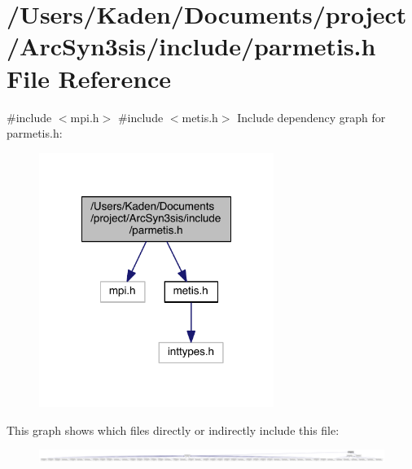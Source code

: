 \hypertarget{a00843}{}\section{/\+Users/\+Kaden/\+Documents/project/\+Arc\+Syn3sis/include/parmetis.h File Reference}
\label{a00843}
{\ttfamily \#include $<$mpi.\+h$>$}\newline
{\ttfamily \#include $<$metis.\+h$>$}\newline
Include dependency graph for parmetis.\+h\+:\nopagebreak
\begin{figure}[H]
\begin{center}
\leavevmode
\includegraphics[width=216pt]{a00844}
\end{center}
\end{figure}
This graph shows which files directly or indirectly include this file\+:\nopagebreak
\begin{figure}[H]
\begin{center}
\leavevmode
\includegraphics[width=350pt]{a00845}
\end{center}
\end{figure}
